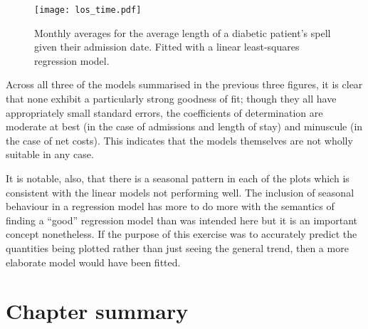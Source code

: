 \begin{figure}[htbp]
    \centering
    \texttt{[image: los\_time.pdf]}
    \caption{Monthly averages for the average length of a diabetic patient's
        spell given their admission date. Fitted with a linear least-squares
        regression model.}%
    \label{fig:los_time}
\end{figure}

Across all three of the models summarised in the previous three figures, it is
clear that none exhibit a particularly strong goodness of fit; though they all
have appropriately small standard errors, the coefficients of determination are
moderate at best (in the case of admissions and length of stay) and minuscule
(in the case of net costs). This indicates that the models themselves are not
wholly suitable in any case.

It is notable, also, that there is a seasonal pattern in each of the plots which
is consistent with the linear models not performing well. The inclusion of
seasonal behaviour in a regression model has more to do more with the semantics
of finding a ``good'' regression model than was intended here but it is an
important concept nonetheless. If the purpose of this exercise was to accurately
predict the quantities being plotted rather than just seeing the general trend,
then a more elaborate model would have been fitted.


\section{Chapter summary}\label{sec:summary}
